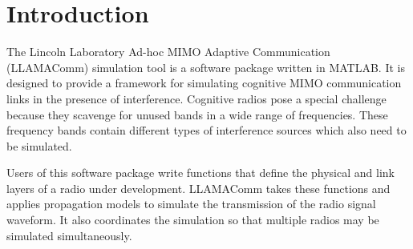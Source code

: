 %  
% 
% 
% 
% 

\chapter{Introduction}

The Lincoln Laboratory Ad-hoc MIMO Adaptive Communication
(LLAMAComm) simulation tool is a software package written in MATLAB.
It is designed to provide a framework for simulating cognitive MIMO
communication links in the presence of interference.  Cognitive
radios pose a special challenge because they scavenge for unused
bands in a wide range of frequencies.  These frequency bands contain
different types of interference sources which also need to be
simulated.

Users of this software package write functions that define the
physical and link layers of a radio under development.  LLAMAComm
takes these functions and applies propagation models to simulate the
transmission of the radio signal waveform.  It also coordinates the
simulation so that multiple radios may be simulated simultaneously.



